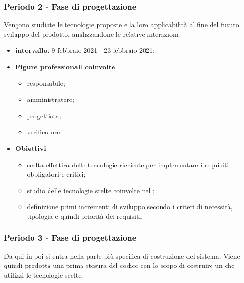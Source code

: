            \subsubsection{Periodo 2 - Fase di progettazione}
        
            Vengono studiate le tecnologie proposte e la loro applicabilità al fine del futuro sviluppo del prodotto, analizzandone le relative interazioni.
    
            \begin{itemize}
                \item \textbf{intervallo: }9 febbraio 2021 - 23 febbraio 2021;
            
            \item  \textbf{Figure professionali coinvolte}
                \begin{itemize}
                    \item responsabile;
                    \item amministratore;
                    \item progettista;
                    \item verificatore.
                \end{itemize}
    
                \item \textbf{Obiettivi}  
                            \begin{itemize}
                                \item scelta effettiva delle tecnologie richieste per implementare i requisiti obbligatori e critici;
                                \item studio delle tecnologie scelte coinvolte nel ;
                                \item definizione primi incrementi di sviluppo secondo i criteri di necessità, tipologia e quindi priorità dei requisiti.
                            \end{itemize}
                \end{itemize}          
            
                \subsubsection{Periodo 3 - Fase di progettazione}
        
                Da qui in poi si entra nella parte più specifica di costruzione del sistema. Viene quindi prodotta una prima stesura del codice con lo scopo di costruire un  che utilizzi le tecnologie scelte.
        
